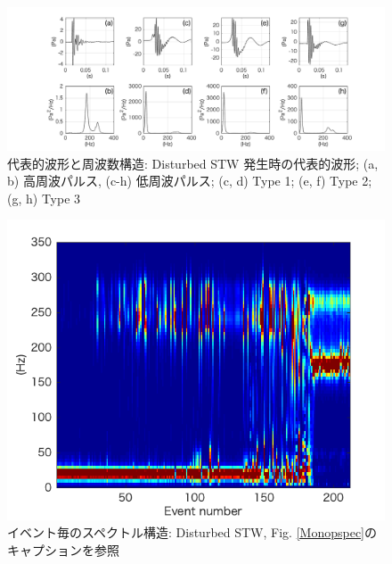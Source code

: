 \documentclass[12pt]{article}
\begin{document}
\begin{landscape}
\begin{figure}[H]
\begin{center}
\includegraphics[scale=1] {Distwaveform.png} 
\caption[代表的波形と周波数構造: Disturbed STW]
{代表的波形と周波数構造: Disturbed STW 発生時の代表的波形; (a, b) 高周波パルス, (c-h) 低周波パルス; (c, d) Type 1; (e, f) Type 2; (g, h) Type 3}
\label{Distwaveform}
\end{center}
\end{figure} 
\end{landscape}


\begin{figure}[H]
\begin{center}
\includegraphics[scale=1] {Distpspec.png} 
\caption[イベント毎のスペクトル構造: Disturbed STW]
{イベント毎のスペクトル構造: Disturbed STW, Fig. \ref{Monopspec}のキャプションを参照}
\label{Distpspec}
\end{center}
\end{figure} 
\end{document}
